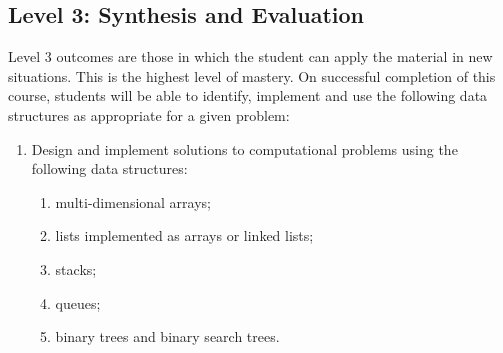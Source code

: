 \documentclass[12pt]{scrartcl}
\begin{document}
\subsection*{Level 3: Synthesis and Evaluation}
Level 3 outcomes are those in which the student can apply the material in new situations. This is the highest level of mastery. On successful completion of this course, students will be able to identify, implement and use the following data structures as appropriate for a given problem:
\begin{enumerate}
    \item Design and implement solutions to computational problems using the following data structures:
    \begin{enumerate}
        \item multi-dimensional arrays;
        \item lists implemented as arrays or linked lists;
        \item stacks;
        \item queues;
        \item binary trees and binary search trees.
    \end{enumerate}
\end{enumerate}
\end{document}
